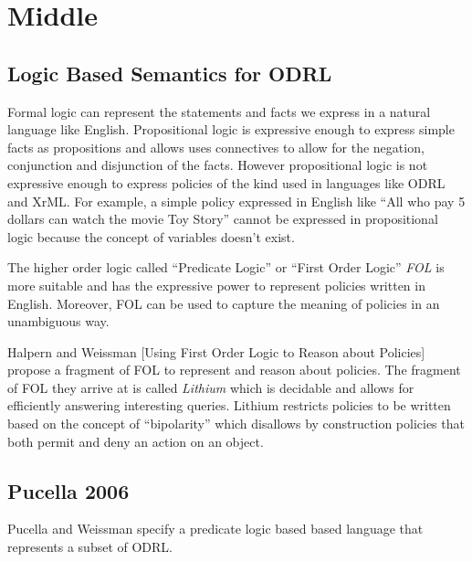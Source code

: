 \chapter{Middle}

\section{Logic Based Semantics for ODRL}


Formal logic can represent the statements and facts we express in a natural language like English. Propositional logic is expressive enough to express simple facts as propositions and allows uses connectives to allow for the negation, conjunction and disjunction of the facts. However propositional logic is not expressive enough to express policies of the kind used in languages like ODRL and XrML. For example, a simple policy expressed in English like ``All who pay 5 dollars can watch the movie Toy Story'' cannot be expressed in propositional logic because the concept of  variables doesn't exist. 

The higher order logic called ``Predicate Logic'' or ``First Order Logic'' \emph{FOL} is more suitable and has the expressive power to represent policies written in English. Moreover, FOL can be used to capture the meaning of policies in an unambiguous way.

Halpern and Weissman [Using First Order Logic to Reason about Policies] propose a fragment of FOL to represent and reason about policies. The fragment of FOL they arrive at is called \emph{Lithium} which is decidable and allows for efficiently answering interesting queries. Lithium restricts policies to be written based on the concept of ``bipolarity'' which disallows by construction policies that both permit and deny an action on an object.

\section{Pucella 2006}
Pucella and Weissman \cite{pucella2006} specify a predicate logic based based language that represents a subset of ODRL.

